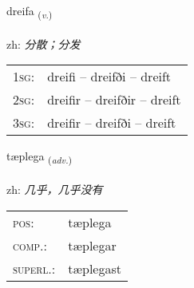 \documentclass[frontgrid, backgrid]{flacards}\usepackage[]{graphicx}\usepackage[]{color}
\begin{document}
\renewcommand{\flhead}{\vskip5pt \fboxsep=0pt {\small\bfseries\footnotesize Sagnorð | 动词}}
\renewcommand{\fcfoot}{\vskip5pt \fboxsep=0pt \hspace{2pt}{\small\bfseries\footnotesize 2K}}

\renewcommand{\blhead}{\vskip5pt {\small\bfseries\footnotesize Sagnorð | 动词 }}
\renewcommand{\bcfoot}{\vskip5pt \hspace{2pt}{\small\bfseries\footnotesize 2K}}


{dreifa \small{\textsubscript{(\textit{v.})}} \\[1ex] %
\textphonetic{[treiːva]} \\
zh: \emph{分散；分发} \\  [2ex]
\renewcommand*{\arraystretch}{0.8}
\begin{tabular}{p{1cm}l}
\textsc{1sg}: & dreifi -- dreifði -- dreift \\ 
\textsc{2sg}: & dreifir -- dreifðir -- dreift \\ 
\textsc{3sg}: & dreifir -- dreifði -- dreift \\ 
\end{tabular}
}

\renewcommand{\flhead}{\vskip5pt \fboxsep=0pt {\small\bfseries\footnotesize Atviksorð | 副词}}
\renewcommand{\fcfoot}{\vskip5pt \fboxsep=0pt \hspace{2pt}{\small\bfseries\footnotesize 2K}}

\renewcommand{\blhead}{\vskip5pt {\small\bfseries\footnotesize Atviksorð | 副词 }}
\renewcommand{\bcfoot}{\vskip5pt \hspace{2pt}{\small\bfseries\footnotesize 2K}}


{tæplega \small{\textsubscript{(\textit{adv.})}} \\[1ex] %
\textphonetic{[tʰaiplɛɣa]} \\
zh: \emph{几乎，几乎没有} \\  [2ex]
\renewcommand*{\arraystretch}{0.8}
\begin{tabular}{ll}
\textsc{pos}: & tæplega \\ 
\textsc{comp.}: & tæplegar \\ 
\textsc{superl.}: & tæplegast \\
\end{tabular}
}
\end{document}
